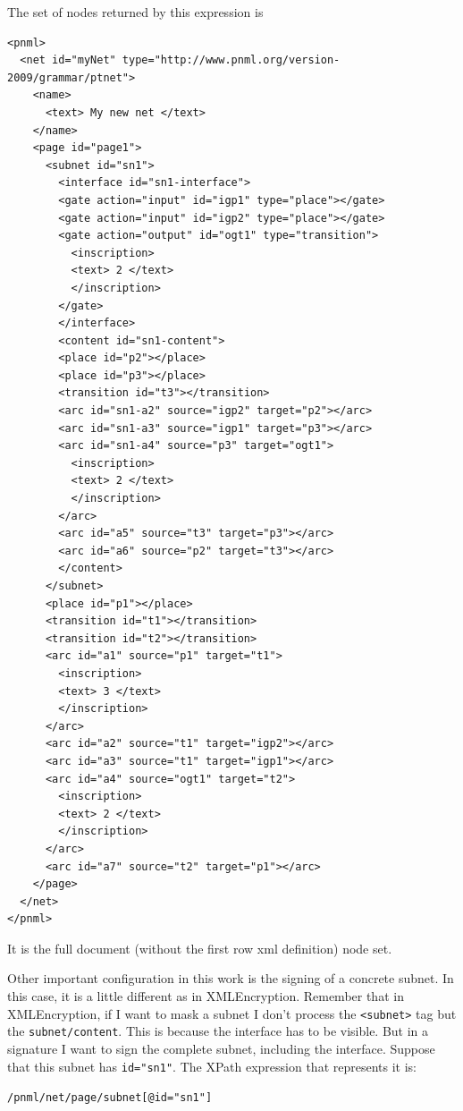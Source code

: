 The set of nodes returned by this expression is

\begin{lstlisting}
<pnml>
  <net id="myNet" type="http://www.pnml.org/version-2009/grammar/ptnet">
    <name>
      <text> My new net </text>
    </name>
    <page id="page1">
      <subnet id="sn1">
        <interface id="sn1-interface">
        <gate action="input" id="igp1" type="place"></gate>
        <gate action="input" id="igp2" type="place"></gate>
        <gate action="output" id="ogt1" type="transition">
          <inscription>
          <text> 2 </text>
          </inscription>
        </gate>
        </interface>
        <content id="sn1-content">
        <place id="p2"></place>
        <place id="p3"></place>
        <transition id="t3"></transition>
        <arc id="sn1-a2" source="igp2" target="p2"></arc>
        <arc id="sn1-a3" source="igp1" target="p3"></arc>
        <arc id="sn1-a4" source="p3" target="ogt1">
          <inscription>
          <text> 2 </text>
          </inscription>
        </arc>
        <arc id="a5" source="t3" target="p3"></arc>
        <arc id="a6" source="p2" target="t3"></arc>
        </content>
      </subnet>
      <place id="p1"></place>
      <transition id="t1"></transition>
      <transition id="t2"></transition>
      <arc id="a1" source="p1" target="t1">
        <inscription>
        <text> 3 </text>
        </inscription>
      </arc>
      <arc id="a2" source="t1" target="igp2"></arc>
      <arc id="a3" source="t1" target="igp1"></arc>
      <arc id="a4" source="ogt1" target="t2">
        <inscription>
        <text> 2 </text>
        </inscription>
      </arc>
      <arc id="a7" source="t2" target="p1"></arc>
    </page>
  </net>
</pnml> 
\end{lstlisting}

It is the full document (without the first row xml definition) node set.

Other important configuration in this work is the signing of a concrete subnet. In this case, it is a little different as in XMLEncryption. Remember that in XMLEncryption, if I want to mask a subnet I don't process the \texttt{<subnet>} tag
but the \texttt{subnet/content}. This is because the interface has to be visible.
But in a signature I want to sign the complete subnet, including the interface.
Suppose that this subnet has \texttt{id="sn1"}. The XPath expression that
represents it is:
\begin{alltt}
    /pnml/net/page/subnet[@id="sn1"]
\end{alltt} 



